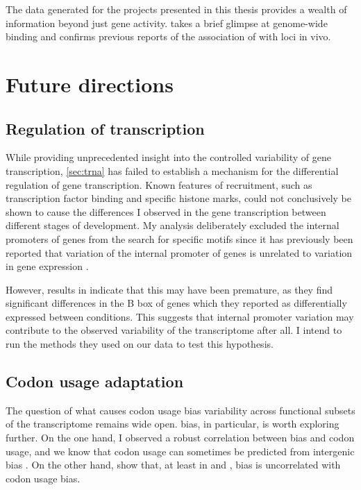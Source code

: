 The  \chipseq data generated for the projects presented in this thesis
provides a wealth of information beyond just \trna gene activity.
 takes a brief glimpse at genome-wide  binding and confirms
previous reports of the association of  with \transsine loci in vivo.

\section{Future directions}

\subsection{Regulation of  transcription}

While providing unprecedented insight into the controlled variability of \trna
gene transcription, \cref{sec:trna} has failed to establish a mechanism for the
differential regulation of \trna gene transcription. Known features of 
recruitment, such as transcription factor binding and specific histone marks,
could not conclusively be shown to cause the differences I observed in the \trna
gene transcription between different stages of development. My analysis
deliberately excluded the internal promoters of \trna genes from the search for
specific motifs since it has previously been reported that variation of the
internal promoter of \trna genes is unrelated to variation in gene expression
\citep{Oler:2010,Canella:2012}.

However, results in \citet{Gingold:2014} indicate that this may have been
premature, as they find significant differences in the B box of \trna genes
which they reported as differentially expressed between conditions. This
suggests that internal promoter variation may contribute to the observed
variability of the \trna transcriptome after all. I intend to run the methods
they used on our data to test this hypothesis.

\subsection{Codon usage adaptation}

The question of what causes codon usage bias variability across functional
subsets of the transcriptome remains wide open. \gc bias, in particular, is
worth exploring further. On the one hand, I observed a robust correlation
between \gc bias and codon usage, and we know that codon usage can sometimes be
predicted from intergenic \gc bias \citep{Chen:2004}. On the other hand,
\citet{Duret:2002} show that, at least in  and , \gc
bias is uncorrelated with codon usage bias.

